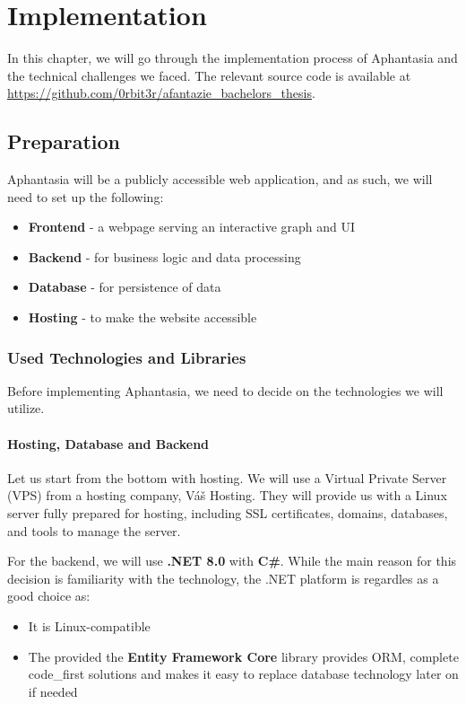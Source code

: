 \chapter{Implementation}
\label{chap:implementation}
In this chapter, we will go through the implementation process of Aphantasia and the technical challenges we faced.
The relevant source code is available at \url{https://github.com/0rbit3r/afantazie_bachelors_thesis}.

\section{Preparation}

Aphantasia will be a publicly accessible web application, and as such, we will need to set up the following:
\begin{itemize}
  \item \textbf{Frontend} - a webpage serving an interactive graph and UI
  \item \textbf{Backend} - for business logic and data processing
  \item \textbf{Database} - for persistence of data
  \item \textbf{Hosting} - to make the website accessible
\end{itemize}

\subsection{Used Technologies and Libraries}
Before implementing Aphantasia, we need to decide on the technologies we will utilize.

\subsubsection{Hosting, Database and Backend}
Let us start from the bottom with hosting.
We will use a Virtual Private Server (VPS) from a hosting company, Váš Hosting.
They will provide us with a Linux server fully prepared for hosting, including
SSL certificates, domains, databases, and tools to manage the server.

For the backend, we will use \textbf{.NET 8.0} with \textbf{C\#}.
While the main reason for this decision is familiarity with the technology, the .NET platform is regardles as a good choice as:
\begin{itemize}
    \item It is Linux-compatible
    \item The provided the \textbf{Entity Framework Core} library provides \gls{ORM}, complete \gls{code_first} solutions and makes it easy to replace database technology later on if needed
\end{itemize}

